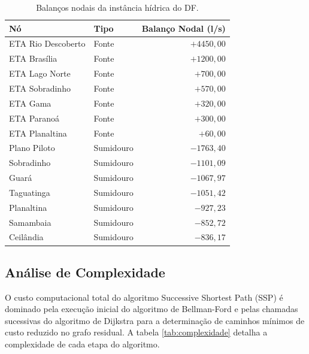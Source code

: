 \vspace{0.3cm}
\begin{table}[H]
  \centering
  \small
  \begin{tabular}{llr}
    \toprule
    \textbf{Nó} & \textbf{Tipo} & \textbf{Balanço Nodal (l/s)} \\
    \midrule
    ETA Rio Descoberto & Fonte & $+4450{,}00$ \\
    ETA Brasília & Fonte & $+1200{,}00$ \\
    ETA Lago Norte & Fonte & $+700{,}00$ \\
    ETA Sobradinho & Fonte & $+570{,}00$ \\
    ETA Gama & Fonte & $+320{,}00$ \\
    ETA Paranoá & Fonte & $+300{,}00$ \\
    ETA Planaltina & Fonte & $+60{,}00$ \\
    \midrule
    Plano Piloto & Sumidouro & $-1763{,}40$ \\
    Sobradinho & Sumidouro & $-1101{,}09$ \\
    Guará & Sumidouro & $-1067{,}97$ \\
    Taguatinga & Sumidouro & $-1051{,}42$ \\
    Planaltina & Sumidouro & $-927{,}23$ \\
    Samambaia & Sumidouro & $-852{,}72$ \\
    Ceilândia & Sumidouro & $-836{,}17$ \\
    \bottomrule
  \end{tabular}
  \caption{Balanços nodais da instância hídrica do DF.}
\end{table}


\subsection{Análise de Complexidade}

O custo computacional total do algoritmo Successive Shortest Path (SSP) é dominado pela execução inicial do algoritmo de Bellman-Ford e pelas chamadas sucessivas do algoritmo de Dijkstra para a determinação de caminhos mínimos de custo reduzido no grafo residual. A tabela \ref{tab:complexidade} detalha a complexidade de cada etapa do algoritmo.

